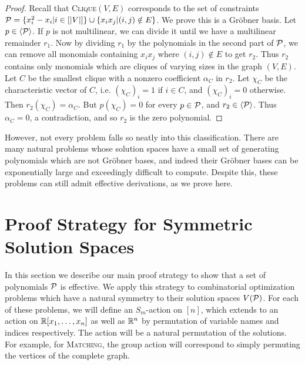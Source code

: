 \begin{proof}
Recall that \textsc{Clique}$(V,E)$ corresponds to the set of constraints $\mathcal P = \{x_i^2 - x_i | i \in [|V|]\} \cup \{ x_ix_j | (i,j) \notin E\}$. 
We prove this is a Gr\"obner basis. Let $p \in \langle \mathcal P \rangle$. If $p$ is not multilinear, we can divide it until we have a multilinear
remainder $r_1$. Now by dividing $r_1$ by the polynomials in the second part of $\mathcal P$, we can remove all monomials containing $x_ix_j$ where $(i,j) \notin E$
to get $r_2$. Thus $r_2$ contains only monomials which are cliques of varying sizes in the graph $(V,E)$. Let $C$ be the smallest clique with a
nonzero coefficient $\alpha_C$ in $r_2$. Let $\chi_C$ be the characteristic vector of $C$, i.e. $(\chi_C)_i = 1$ if $i \in C$, and $(\chi_C)_i = 0$ otherwise.
Then $r_2(\chi_C) = \alpha_C$. But $p(\chi_C) = 0$ for every $p \in \mathcal P$, and $r_2 \in \langle \mathcal P \rangle$. Thus $\alpha_C = 0$, a contradiction, and so $r_2$ is the 
zero polynomial.
\end{proof}

However, not every problem falls so neatly into this classification. There are many natural problems whose solution spaces have a small set of generating
polynomials which are not Gr\"obner bases, and indeed their Gr\"obner bases can be exponentially large and exceedingly difficult to compute. Despite this,
these problems can still admit effective derivations, as we prove here.

\section{Proof Strategy for Symmetric Solution Spaces}
In this section we describe our main proof strategy to show that a set of polynomials $\mathcal P$ is effective. 
We apply this strategy to combinatorial optimization problems which have a natural symmetry to their solution spaces $V(\mathcal P)$. 
For each of these problems, we will define an $S_m$-action on $[n]$, which extends to an action on $\mathbb R[x_1,\dots,x_n]$ as well as $\mathbb R^n$ by permutation of variable names and indices respectively. 
The action will be a natural permutation of the solutions. For example, for \textsc{Matching}, the group action will correspond to simply permuting the vertices of the complete graph. 

